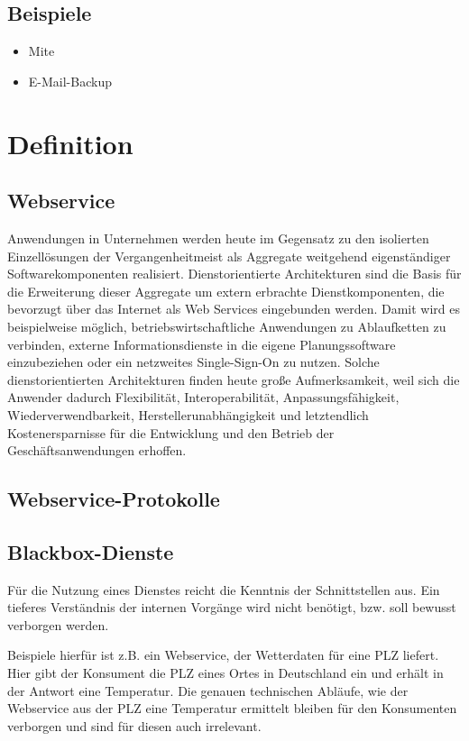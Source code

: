 \documentclass[10pt,a4paper]{article}
\begin{document}
\subsection{Beispiele}
\label{l:beispiele}
\begin{itemize}
\item Mite
\item E-Mail-Backup
\end{itemize}
\section{Definition}
\label{l:definition}
\subsection{Webservice}
Anwendungen in Unternehmen werden heute im Gegensatz zu den isolierten Einzellösungen
der Vergangenheitmeist als Aggregate weitgehend eigenständiger Softwarekomponenten realisiert.
Dienstorientierte Architekturen sind die Basis für die Erweiterung dieser Aggregate um
extern erbrachte Dienstkomponenten, die bevorzugt über das Internet als Web Services eingebunden
werden. Damit wird es beispielweise möglich, betriebswirtschaftliche Anwendungen zu
Ablaufketten zu verbinden, externe Informationsdienste in die eigene Planungssoftware einzubeziehen
oder ein netzweites Single-Sign-On zu nutzen. Solche dienstorientierten Architekturen
finden heute große Aufmerksamkeit, weil sich die Anwender dadurch Flexibilität, Interoperabilität,
Anpassungsfähigkeit, Wiederverwendbarkeit, Herstellerunabhängigkeit und letztendlich
Kostenersparnisse für die Entwicklung und den Betrieb der Geschäftsanwendungen erhoffen. \cite{addo}
\subsection{Webservice-Protokolle}
\label{l:wsprot}
\subsection{Blackbox-Dienste}
\label{l:blackbox}
Für die Nutzung eines Dienstes reicht die Kenntnis der Schnittstellen aus. Ein tieferes Verständnis
der internen Vorgänge wird nicht benötigt, bzw. soll bewusst verborgen werden. \cite{hhxmlwssoa}

Beispiele hierfür ist z.B. ein Webservice, der Wetterdaten für eine PLZ liefert. Hier gibt der Konsument die PLZ eines Ortes in Deutschland ein und erhält in der Antwort eine Temperatur. Die genauen technischen Abläufe, wie der Webservice aus der PLZ eine Temperatur ermittelt bleiben für den Konsumenten verborgen und sind für diesen auch irrelevant.
\end{document}
